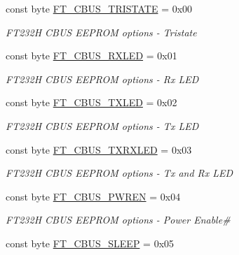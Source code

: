 \begin{DoxyCompactItemize}
\item 
const byte \mbox{\hyperlink{class_f_t_d2_x_x___n_e_t_1_1_f_t_d_i_1_1_f_t__232_h___c_b_u_s___o_p_t_i_o_n_s_a87f6bc339ec2e6bbb3ad093eb9d38278}{F\+T\+\_\+\+C\+B\+U\+S\+\_\+\+T\+R\+I\+S\+T\+A\+TE}} = 0x00
\begin{DoxyCompactList}\small\item\em F\+T232H C\+B\+US E\+E\+P\+R\+OM options -\/ Tristate \end{DoxyCompactList}\item 
const byte \mbox{\hyperlink{class_f_t_d2_x_x___n_e_t_1_1_f_t_d_i_1_1_f_t__232_h___c_b_u_s___o_p_t_i_o_n_s_a2d170eb77102deec0fdc449514378ebd}{F\+T\+\_\+\+C\+B\+U\+S\+\_\+\+R\+X\+L\+ED}} = 0x01
\begin{DoxyCompactList}\small\item\em F\+T232H C\+B\+US E\+E\+P\+R\+OM options -\/ Rx L\+ED \end{DoxyCompactList}\item 
const byte \mbox{\hyperlink{class_f_t_d2_x_x___n_e_t_1_1_f_t_d_i_1_1_f_t__232_h___c_b_u_s___o_p_t_i_o_n_s_a1168929483b9a6ecfbf2d94cc5787449}{F\+T\+\_\+\+C\+B\+U\+S\+\_\+\+T\+X\+L\+ED}} = 0x02
\begin{DoxyCompactList}\small\item\em F\+T232H C\+B\+US E\+E\+P\+R\+OM options -\/ Tx L\+ED \end{DoxyCompactList}\item 
const byte \mbox{\hyperlink{class_f_t_d2_x_x___n_e_t_1_1_f_t_d_i_1_1_f_t__232_h___c_b_u_s___o_p_t_i_o_n_s_a6f140d9980ac5ba097304a39f41d4a67}{F\+T\+\_\+\+C\+B\+U\+S\+\_\+\+T\+X\+R\+X\+L\+ED}} = 0x03
\begin{DoxyCompactList}\small\item\em F\+T232H C\+B\+US E\+E\+P\+R\+OM options -\/ Tx and Rx L\+ED \end{DoxyCompactList}\item 
const byte \mbox{\hyperlink{class_f_t_d2_x_x___n_e_t_1_1_f_t_d_i_1_1_f_t__232_h___c_b_u_s___o_p_t_i_o_n_s_ab82b0e2020f570acf826388fc9127870}{F\+T\+\_\+\+C\+B\+U\+S\+\_\+\+P\+W\+R\+EN}} = 0x04
\begin{DoxyCompactList}\small\item\em F\+T232H C\+B\+US E\+E\+P\+R\+OM options -\/ Power Enable\# \end{DoxyCompactList}\item 
const byte \mbox{\hyperlink{class_f_t_d2_x_x___n_e_t_1_1_f_t_d_i_1_1_f_t__232_h___c_b_u_s___o_p_t_i_o_n_s_ae1124ce93814444c73b9d02786289c09}{F\+T\+\_\+\+C\+B\+U\+S\+\_\+\+S\+L\+E\+EP}} = 0x05

\end{DoxyCompactItemize}
